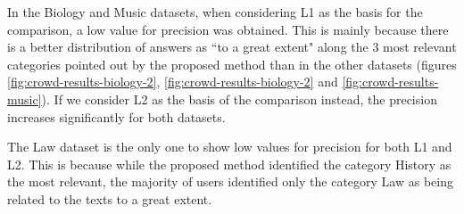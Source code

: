 In the Biology and Music datasets, when considering L1 as the basis for the comparison, a low value for precision was obtained. This is mainly because there is a better distribution of answers as ``to a great extent" along the 3 most relevant categories pointed out by the proposed method than in the other datasets (figures \ref{fig:crowd-results-biology-2}, \ref{fig:crowd-results-biology-2} and \ref{fig:crowd-results-music}). If we consider L2 as the basis of the comparison instead, the precision increases significantly for both datasets. 

The Law dataset is the only one to show low values for precision for both L1 and L2. This is because while the proposed method identified the category History as the most relevant, the majority of users identified only the category Law as being related to the texts to a great extent.















